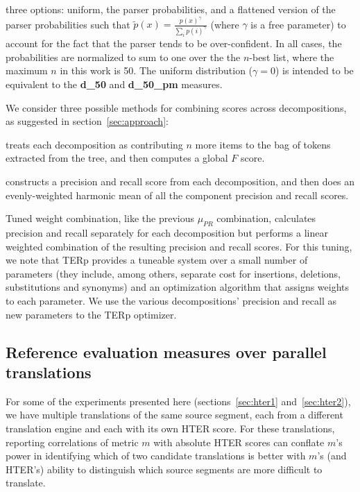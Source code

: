 \documentclass{kluwer}    %
\begin{document}
\begin{article}
\begin{description}
  three options: uniform, the parser probabilities, and a flattened
  version of the parser probabilities such that $\tilde{p}(x) =
  \frac{p(x)^\gamma}{\sum_ip(i)^\gamma}$ (where $\gamma$ is a free
  parameter) to account for the fact that the parser tends to be
  over-confident.  In all cases, the probabilities are normalized to
  sum to one over the the $n$-best list, where the maximum $n$ in this
  work is 50.  The uniform distribution ($\gamma = 0$) is intended to
  be equivalent to the \cite{owczarzak07evaluatingmt}
  \textbf{d\_50} and \textbf{d\_50\_pm} measures.
\item[Score combination.] We consider three possible methods for
  combining scores across decompositions, as suggested in
  section~\ref{sec:approach}:
  \begin{description}
  \item[$F\lbrack\cdot\rbrack$] treats each decomposition as
    contributing $n$ more items to the bag of tokens extracted from
    the tree, and then computes a global $F$ score.
  \item[$\mu_{PR}\lbrack\cdot\rbrack$] constructs a precision and
    recall score from each decomposition, and then does an
    evenly-weighted harmonic mean of all the component precision and
    recall scores.
  \item Tuned weight combination, like the previous $\mu_{PR}$
    combination, calculates precision and
    recall separately for each decomposition but performs a linear
    weighted combination of the resulting precision and recall scores.
    For this tuning, we note that TERp \cite{snover09terp} provides a
    tuneable system over a small number of parameters (they include,
    among others, separate cost for insertions, deletions,
    substitutions and synonyms) and an optimization algorithm that
    assigns weights to each parameter. We use the various
    decompositions' precision and recall as new parameters to the TERp
    optimizer.
  \end{description}
\end{description}

\subsection{Reference evaluation measures over parallel translations}
\label{sec:metricsreference}
For some of the experiments presented here (sections~\ref{sec:hter1}
and~\ref{sec:hter2}), we have multiple translations of the same source
segment, each from a different translation engine and each with its
own HTER score.  For these translations, reporting correlations of
metric $m$ with absolute HTER scores can conflate $m$'s power in
identifying which of two candidate translations is better with $m$'s
(and HTER's) ability to distinguish which source segments are more
difficult to translate.


\end{article}
\end{document}

